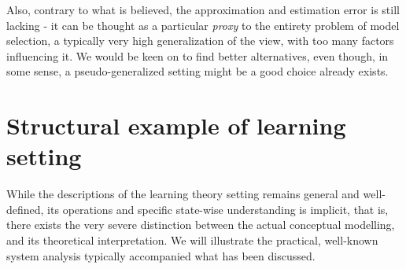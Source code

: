 Also, contrary to what is believed, the approximation and estimation error is still lacking - it can be thought as a particular \textit{proxy} to the entirety problem of model selection, a typically very high generalization of the view, with too many factors influencing it. We would be keen on to find better alternatives, even though, in some sense, a pseudo-generalized setting might be a good choice already exists. 

\section{Structural example of learning setting}

While the descriptions of the learning theory setting remains general and well-defined, its operations and specific state-wise understanding is implicit, that is, there exists the very severe distinction between the actual conceptual modelling, and its theoretical interpretation. We will illustrate the practical, well-known system analysis typically accompanied what has been discussed. 

